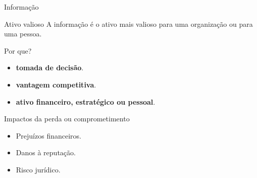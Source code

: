 \begin{frame}{Informação}

    \begin{block}{Ativo valioso}
        A informação é o ativo mais valioso para uma organização ou para uma pessoa.
    \end{block}

    \begin{exampleblock}{Por que?}
        \begin{itemize}
            \item \textbf{tomada de decisão}.
            \item \textbf{vantagem competitiva}.
            \item \textbf{ativo financeiro, estratégico ou pessoal}.
        \end{itemize}
    \end{exampleblock}

    \begin{alertblock}{Impactos da perda ou comprometimento}
        \begin{itemize}
            \item Prejuízos financeiros.
            \item Danos à reputação.
            \item Risco jurídico.
        \end{itemize}
    \end{alertblock}

\end{frame}

